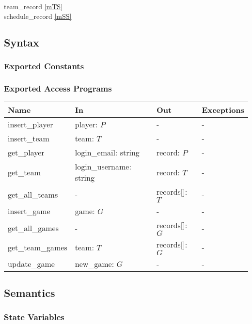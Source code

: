 \documentclass[12pt, titlepage]{article}
\begin{document}
team\_record \ref{mTS} \\
schedule\_record \ref{mSS} \\

\subsection{Syntax}

\subsubsection{Exported Constants}

\subsubsection{Exported Access Programs}

\begin{center}
\begin{tabular}{p{4cm} p{4.5cm} p{2.5cm} p{2cm}}
\hline
\textbf{Name} & \textbf{In} & \textbf{Out} & \textbf{Exceptions} \\
\hline
insert\_player & player: $P$ & - & - \\
insert\_team & team: $T$ & - & - \\
get\_player & login\_email: string & record: $P$ & - \\
get\_team & login\_username: string & record: $T$ & - \\
get\_all\_teams & - & records[]: $T$ & - \\
insert\_game & game: $G$ & - & - \\
get\_all\_games & - & records[]: $G$ & - \\
get\_team\_games & team: $T$ & records[]: $G$ & - \\
update\_game & new\_game: $G$ & - & - \\
\hline
\end{tabular}
\end{center}

\subsection{Semantics}

\subsubsection{State Variables}
\end{document}
